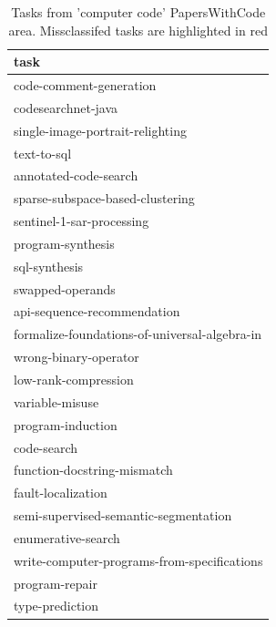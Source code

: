 \documentclass[11pt]{report}
\begin{document}
  \begin{table}[htbp]
\centering
\caption{Tasks from 'computer code' PapersWithCode area. Missclassifed tasks are
highlighted in red}
\begin{tabular}{|l|}
\hline
\toprule
                                          task \\
\hline

\midrule
                       code-comment-generation \\
                            codesearchnet-java \\
              {\color{red} single-image-portrait-relighting}\\
                                   text-to-sql \\
                         annotated-code-search \\
              {\color{red} sparse-subspace-based-clustering}\\
                     sentinel-1-sar-processing \\
                             program-synthesis \\
                                 sql-synthesis \\
                              swapped-operands \\
                   api-sequence-recommendation \\
 formalize-foundations-of-universal-algebra-in \\
                         wrong-binary-operator \\
                          {\color{red} low-rank-compression}\\
                               variable-misuse \\
                             program-induction \\
                                   code-search \\
                   function-docstring-mismatch \\
                            fault-localization \\
         semi-supervised-semantic-segmentation \\
                            {\color{red} enumerative-search}\\
   write-computer-programs-from-specifications \\
                                program-repair \\
                               type-prediction \\

\end{tabular}
\end{table}
\end{document}
